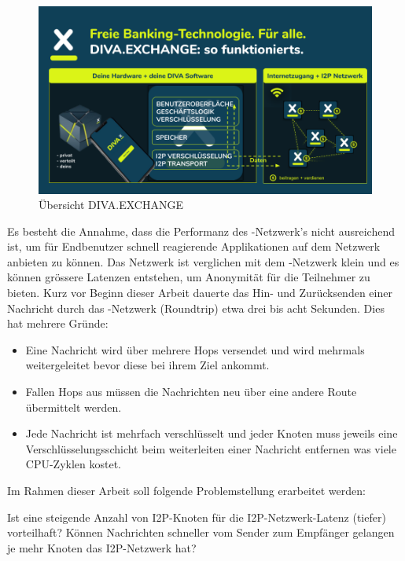 \begin{figure}[thp!]
    \includegraphics[width=1.0\textwidth]{img/divax-overview.png}
    \caption{Übersicht DIVA.EXCHANGE}\label{fig:divax_overview}
\end{figure}

Es besteht die Annahme, dass die Performanz des -Netzwerk's nicht ausreichend ist, um für Endbenutzer schnell reagierende Applikationen auf dem Netzwerk anbieten zu können.
Das Netzwerk ist verglichen mit dem -Netzwerk klein und es können grössere Latenzen entstehen, um Anonymität für die Teilnehmer zu bieten.
Kurz vor Beginn dieser Arbeit dauerte das Hin- und Zurücksenden einer Nachricht durch das -Netzwerk (Roundtrip) etwa drei bis acht Sekunden. Dies hat mehrere Gründe:

\begin{itemize}
    \item Eine Nachricht wird über mehrere Hops versendet und wird mehrmals weitergeleitet bevor diese bei ihrem Ziel ankommt.
    \item Fallen Hops aus müssen die Nachrichten neu über eine andere Route übermittelt werden.
    \item Jede Nachricht ist mehrfach verschlüsselt und jeder Knoten muss jeweils eine Verschlüsselungsschicht beim weiterleiten einer Nachricht entfernen was viele CPU-Zyklen kostet.
\end{itemize}

Im Rahmen dieser Arbeit soll folgende Problemstellung erarbeitet werden:

\begin{hyp} \label{hyp:first}
    Ist eine steigende Anzahl von I2P-Knoten für die I2P-Netzwerk-Latenz (tiefer) vorteilhaft?
    Können Nachrichten schneller vom Sender zum Empfänger gelangen je mehr Knoten das I2P-Netzwerk hat?
\end{hyp}

